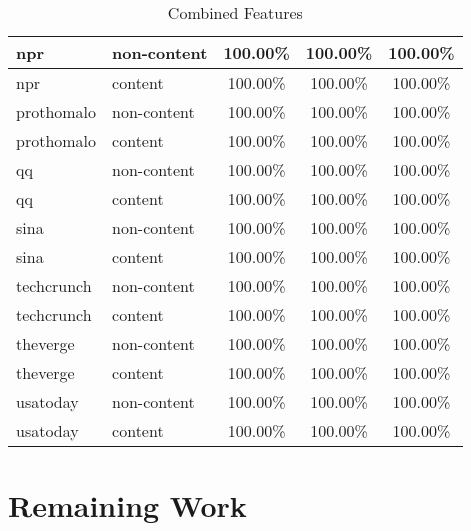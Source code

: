 \documentclass{acm_proc_article-sp}
\begin{document}
\begin{table}
\centering
\caption{Combined Features}
\begin{tabular}{|l|l|c|c|c|} \hline
npr&non-content&100.00\%&100.00\%&100.00\%\\ \hline
npr&content&100.00\%&100.00\%&100.00\%\\ \hline
prothomalo&non-content&100.00\%&100.00\%&100.00\%\\ \hline
prothomalo&content&100.00\%&100.00\%&100.00\%\\ \hline
qq&non-content&100.00\%&100.00\%&100.00\%\\ \hline
qq&content&100.00\%&100.00\%&100.00\%\\ \hline
sina&non-content&100.00\%&100.00\%&100.00\%\\ \hline
sina&content&100.00\%&100.00\%&100.00\%\\ \hline
techcrunch&non-content&100.00\%&100.00\%&100.00\%\\ \hline
techcrunch&content&100.00\%&100.00\%&100.00\%\\ \hline
theverge&non-content&100.00\%&100.00\%&100.00\%\\ \hline
theverge&content&100.00\%&100.00\%&100.00\%\\ \hline
usatoday&non-content&100.00\%&100.00\%&100.00\%\\ \hline
usatoday&content&100.00\%&100.00\%&100.00\%\\ \hline
\end{tabular}
\end{table}

\section{Remaining Work}





\end{document}

